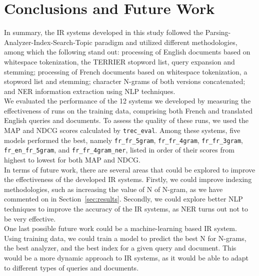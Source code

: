 \section{Conclusions and Future Work}
\label{sec:conclusion}

In summary, the IR systems developed in this study followed the Parsing-Analyzer-Index-Search-Topic paradigm and
utilized different methodologies, among which the following stand out: processing of English documents based on
whitespace tokenization, the TERRIER stopword list, query expansion and stemming;
processing of French documents based on whitespace tokenization, a stopword list and stemming;
character N-grams of both versions concatenated;
and NER information extraction using NLP techniques.\\

We evaluated the performance of the 12 systems we developed by measuring the effectiveness of runs on the training
data, comprising both French and translated English queries and documents.
To assess the quality of these runs, we used the MAP and NDCG scores calculated by \texttt{trec\_eval}.
Among these systems, five models performed the best, namely \texttt{fr\_fr\_5gram}, \texttt{fr\_fr\_4gram},
\texttt{fr\_fr\_3gram}, \texttt{fr\_en\_fr\_5gram}, and \texttt{fr\_fr\_4gram\_ner}, listed in order of their scores
from highest to lowest for both MAP and NDCG.\\

In terms of future work, there are several areas that could be explored to improve the effectiveness of the developed
IR systems.
Firstly, we could improve indexing methodologies, such as increasing the value of N of N-gram, as we have commented on
in Section~\ref{sec:results}.
Secondly, we could explore better NLP techniques to improve the accuracy of the IR systems, as NER turns out not to be
very effective. \\

One last possible future work could be a machine-learning based IR system. Using training data, we could train a model
to predict the best N for N-grams, the best analyzer, and the best index for a given query and document.
This would be a more dynamic approach to IR systems, as it would be able to adapt to different types of queries and
documents.